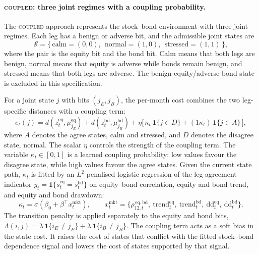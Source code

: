 \documentclass[10pt]{article}
\newcommand{\zeq}{z^{\mathrm{eq}}_t}
\newcommand{\zbd}{z^{\mathrm{bd}}_t}
\newcommand{\Reg}{\mathcal{S}}
\newcommand{\Acoup}{\textsc{coupled}}
\begin{document}
\paragraph{\Acoup{}: three joint regimes with a coupling probability.}
The \Acoup{} approach represents the stock--bond environment with three joint regimes. Each
leg has a benign or adverse bit, and the admissible joint states are
\[
    \Reg=\{\,\text{calm}=(0,0),\ \ \text{normal}=(1,0),\ \ \text{stressed}=(1,1)\,\},
\]
where the pair is the equity bit and the bond bit. Calm means that both legs are benign,
normal means that equity is adverse while bonds remain benign, and stressed means that both
legs are adverse. The benign-equity/adverse-bond state is excluded in this specification.

For a joint state $j$ with bits $(j_E,j_B)$, the per-month cost combines the two leg-specific
distances with a coupling term:
\begin{equation}
    e_t(j)=d\!\left(\zeq,\mu^{\mathrm{eq}}_{j_E}\right)+d\!\left(\zbd,\mu^{\mathrm{bd}}_{j_B}\right)
    +\eta\Big[\,\kappa_t\,\mathbf{1}\{j\in D\}+(1\kappa_t)\,\mathbf{1}\{j\in A\}\,\Big],
    \label{eq:emission}
\end{equation}
where $A$ denotes the agree states, calm and stressed, and $D$ denotes the disagree state,
normal. The scalar $\eta$ controls the strength of the coupling term. The variable
$\kappa_t\in[0,1]$ is a learned coupling probability: low values favour the disagree state, while
high values favour the agree states. Given the current state path, $\kappa_t$ is fitted by an
$L^2$-penalised logistic regression of the leg-agreement indicator
$y_t=\mathbf{1}\{s^{\mathrm{eq}}_t=s^{\mathrm{bd}}_t\}$ on equity--bond correlation, equity
and bond trend, and equity and bond drawdown:
\begin{equation}
    \kappa_t=\sigma\!\left(\beta_0+\beta^{\top}x^{\mathrm{mkt}}_t\right),\qquad
    x^{\mathrm{mkt}}_t=\big\{\rho^{\,\mathrm{eq,bd}}_{12,t},\ \mathrm{trend}^{\mathrm{eq}}_t,\
    \mathrm{trend}^{\mathrm{bd}}_t,\ \mathrm{dd}^{\mathrm{eq}}_t,\ \mathrm{dd}^{\mathrm{bd}}_t\big\}.
    \label{eq:wt}
\end{equation}
The transition penalty is applied separately to the equity and bond bits,
$\Lambda(i,j)=\lambda\,\mathbf{1}\{i_E\neq j_E\}+\lambda\,\mathbf{1}\{i_B\neq j_B\}$.
The coupling term acts as a soft bias in the state cost. It raises the cost of states that
conflict with the fitted stock--bond dependence signal and lowers the cost of states
supported by that signal.
\end{document}
